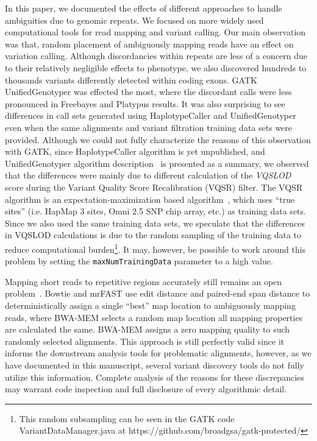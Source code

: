 \documentclass[10pt,a4paper]{article}
\begin{document}
In this paper, we documented the effects of different approaches to handle ambiguities due to genomic repeats. We focused on more widely used computational tools for read mapping and variant calling. Our main observation was that, random placement of ambiguously mapping reads have an effect on variation calling. Although discordancies within repeats are less of a concern due to their relatively negligible 
effects to phenotype, we also discovered hundreds to thousands variants differently detected within coding exons. GATK UnifiedGenotyper was effected the most, where the discordant calls were less pronounced in Freebayes and Platypus results. It was also surprising to see differences in call sets generated using HaplotypeCaller and UnifiedGenotyper even when the same alignments and variant filtration training data sets were provided. Although we could not fully characterize the reasons
of this observation with GATK, since HaplotypeCaller algorithm is yet unpublished, and UnifiedGenotyper algorithm description~\cite{DePristo2011} is presented as a summary, we observed that the differences were
mainly due to different calculation of the {\it VQSLOD} score during the Variant Quality Score Recalibration (VQSR) filter. The VQSR algorithm is an expectation-maximization based algorithm~\cite{DePristo2011},
which uses ``true sites'' (i.e. HapMap 3 sites, Omni 2.5 SNP chip array, etc.) as training data sets. Since we also used the same training data sets, 
we speculate that the differences in VQSLOD calculations is due to the random sampling of the training data
to reduce computational burden\footnote{This random subsampling can be seen in the GATK code VariantDataManager.java at https://github.com/broadgsa/gatk-protected/}. It may, however, be possible to work around this problem by setting the {\tt maxNumTrainingData} parameter to a high value.

Mapping short reads to repetitive regions accurately still remains an open problem~\cite{Treangen2012}. Bowtie and mrFAST use edit distance and paired-end span distance to deterministically assign a single ``best'' map location to ambiguously mapping reads, where BWA-MEM selects a random map location all mapping properties are calculated the same. BWA-MEM assigns a zero mapping quality
to such randomly selected alignments. This approach is still perfectly valid since it informs the downstream analysis tools for problematic alignments, however, as we have documented in this manuscript, 
several variant discovery tools do not fully utilize this information. Complete analysis of the reasons for these discrepancies may warrant code inspection and full disclosure of every algorithmic detail.
\end{document}
